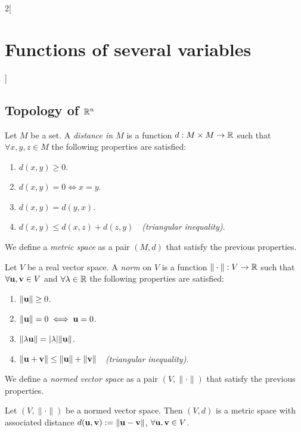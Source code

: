 \documentclass[../../../main.tex]{subfiles}
\begin{document}
\begin{multicols}{2}[\section{Functions of several variables}]
  \subsection{Topology of \texorpdfstring{$\mathbb{R}^n$}{Rn}}
  \begin{definition}
    Let $M$ be a set. A \textit{distance in $M$} is a function $d:M\times M\rightarrow\mathbb{R} $ such that $\forall x,y,z\in M$ the following properties are satisfied:
    \begin{enumerate}
      \item $d(x,y)\geq 0$.
      \item $d(x,y)=0\iff x=y$.
      \item $d(x,y)=d(y,x)$.
      \item $d(x,y)\leq d(x,z)+d(z,y)\quad$\textit{(triangular inequality)}.
    \end{enumerate}
    We define a \textit{metric space} as a pair $(M,d)$ that satisfy the previous properties.
    \label{FOSV_metric}
  \end{definition}
  \begin{definition}\label{FOSV_norm}
    Let $V$ be a real vector space. A \textit{norm} on $V$ is a function $\|\cdot\|:V\rightarrow\mathbb{R} $ such that $\forall \boldsymbol{\mathrm{u}},\boldsymbol{\mathrm{v}}\in V$ and $\forall\lambda\in\mathbb{R} $ the following properties are satisfied:
    \begin{enumerate}
      \item $\|\boldsymbol{\mathrm{u}}\|\geq 0$.
      \item $\|\boldsymbol{\mathrm{u}}\|=0\iff \boldsymbol{\mathrm{u}}=0$.
      \item $\|\lambda \boldsymbol{\mathrm{u}}\|=|\lambda|\|\boldsymbol{\mathrm{u}}\|$.
      \item $\|\boldsymbol{\mathrm{u}}+\boldsymbol{\mathrm{v}}\|\leq \|\boldsymbol{\mathrm{u}}\|+\|\boldsymbol{\mathrm{v}}\|\quad$\textit{(triangular inequality)}.
    \end{enumerate}
    We define a \textit{normed vector space} as a pair $(V,\|\cdot\|)$ that satisfy the previous properties.
  \end{definition}
  \begin{prop}
    Let $(V,\|\cdot\|)$ be a normed vector space. Then $(V,d)$ is a metric space with associated distance $d(\boldsymbol{\mathrm{u}},\boldsymbol{\mathrm{v}}):=\|\boldsymbol{\mathrm{u}}-\boldsymbol{\mathrm{v}}\|$, $\forall \boldsymbol{\mathrm{u}},\boldsymbol{\mathrm{v}}\in V$.
  \end{prop}
  \begin{definition}

\end{definition}
\end{multicols}
\end{document}
